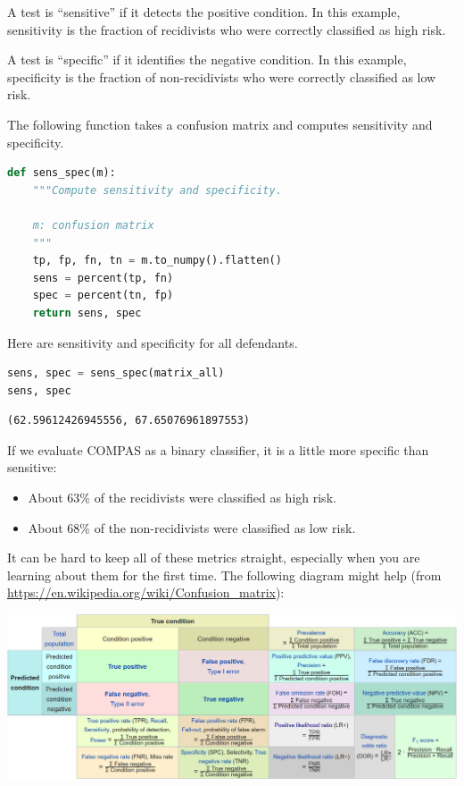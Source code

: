 A test is ``sensitive'' if it detects the positive condition. In this
example, sensitivity is the fraction of recidivists who were correctly
classified as high risk.

A test is ``specific'' if it identifies the negative condition. In this
example, specificity is the fraction of non-recidivists who were
correctly classified as low risk.

The following function takes a confusion matrix and computes sensitivity
and specificity.

\begin{lstlisting}[language=Python,style=source]
def sens_spec(m):
    """Compute sensitivity and specificity.
    
    m: confusion matrix
    """
    tp, fp, fn, tn = m.to_numpy().flatten()
    sens = percent(tp, fn)
    spec = percent(tn, fp)
    return sens, spec
\end{lstlisting}

Here are sensitivity and specificity for all defendants.

\begin{lstlisting}[language=Python,style=source]
sens, spec = sens_spec(matrix_all)
sens, spec
\end{lstlisting}

\begin{lstlisting}[style=output]
(62.59612426945556, 67.65076961897553)
\end{lstlisting}

If we evaluate COMPAS as a binary classifier, it is a little more
specific than sensitive:

\begin{itemize}
\item
  About 63\% of the recidivists were classified as high risk.
\item
  About 68\% of the non-recidivists were classified as low risk.
\end{itemize}

It can be hard to keep all of these metrics straight, especially when
you are learning about them for the first time. The following diagram
might help (from \url{https://en.wikipedia.org/wiki/Confusion_matrix}):

\includegraphics{figs/confusion_matrix2.png}

